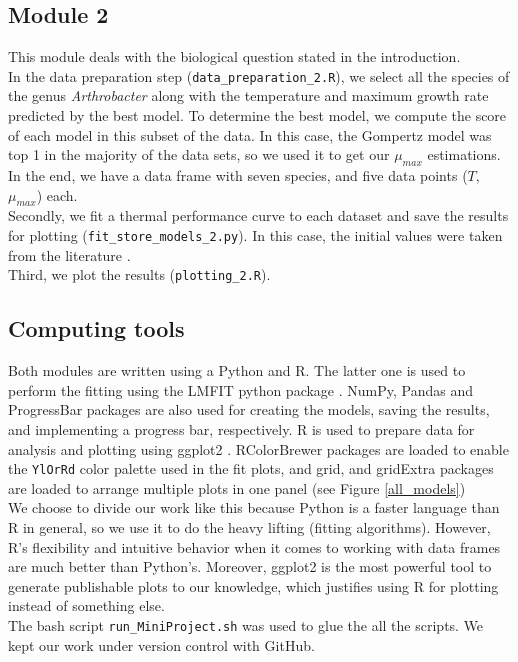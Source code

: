 \documentclass[titlepage,11pt]{article}
\begin{document}
\begin{linenumbers}
	\subsection{Module 2}
	This module deals with the biological question stated in the introduction. \\
	In the data preparation step (\verb|data_preparation_2.R|), we select all the species of the genus \textit{Arthrobacter} along with the temperature and maximum growth rate predicted by the best model. To determine the best model, we compute the score of each model in this subset of the data. In this case, the Gompertz model was top 1 in the majority of the data sets, so we used it to get our $ \mu_{max} $ estimations. In the end, we have a data frame with seven species, and five data points ($ T $, $ \mu_{max} $) each. \\
	Secondly, we fit a thermal performance curve to each dataset and save the results for plotting (\verb|fit_store_models_2.py|). In this case, the initial values were taken from the literature  \cite{Lactin1995}.\\
	Third, we plot the results (\verb|plotting_2.R|).
	\subsection{Computing tools}
	Both modules are written using a Python and R. The latter one is used to perform the fitting using the LMFIT python package \cite{Newville2014}. NumPy, Pandas \cite{Virtanen2020} and ProgressBar packages are also used for creating the models, saving the results, and implementing a progress bar, respectively. R is used to prepare data for analysis and plotting using ggplot2 \cite{Wickham2016}. RColorBrewer packages are loaded to enable the \verb|YlOrRd| color palette used in the fit plots, and grid, and gridExtra packages are loaded to arrange multiple plots in one panel (see Figure \ref{all_models})\\
	We choose to divide our work like this because Python is a faster language than R in general, so we use it to do the heavy lifting (fitting algorithms). However, R's flexibility and intuitive behavior when it comes to working with data frames are much better than Python's. Moreover, ggplot2 is the most powerful tool to generate publishable plots to our knowledge, which justifies using R for plotting instead of something else.\\
	The bash script \verb|run_MiniProject.sh| was used to glue the all the scripts. We kept our work under version control with GitHub.
	

\end{linenumbers}
\end{document}
